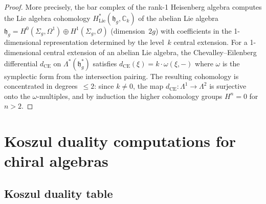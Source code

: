 \begin{proof}
More precisely, the bar complex of the rank-1 Heisenberg algebra computes the Lie algebra cohomology $H^*_{\mathrm{Lie}}(\mathfrak{h}_g, \mathbb{C}_k)$ of the abelian Lie algebra $\mathfrak{h}_g = H^0(\Sigma_g, \Omega^1) \oplus H^1(\Sigma_g, \mathcal{O})$ (dimension~$2g$) with coefficients in the 1-dimensional representation determined by the level~$k$ central extension.  For a 1-dimensional central extension of an abelian Lie algebra, the Chevalley--Eilenberg differential $d_{\mathrm{CE}}$ on $\Lambda^*(\mathfrak{h}_g^*)$ satisfies $d_{\mathrm{CE}}(\xi) = k \cdot \omega(\xi, -)$ where $\omega$ is the symplectic form from the intersection pairing.  The resulting cohomology is concentrated in degrees~$\leq 2$: since $k \neq 0$, the map $d_{\mathrm{CE}}: \Lambda^1 \to \Lambda^2$ is surjective onto the $\omega$-multiples, and by induction the higher cohomology groups $H^n = 0$ for $n > 2$.
\end{proof}

\section{Koszul duality computations for chiral algebras}

\subsection{Koszul duality table}

